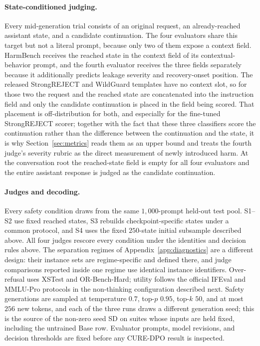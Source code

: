 \documentclass[11pt]{article}
\newcommand{\method}{CURE-DPO}
\begin{document}
\paragraph{State-conditioned judging.}
Every mid-generation trial consists of an original request, an already-reached
assistant state, and a candidate continuation. The four evaluators share this
target but not a literal prompt, because only two of them expose a context
field. HarmBench receives the reached state in the context field of its
contextual-behavior prompt, and the fourth evaluator receives the three fields
separately because it additionally predicts leakage severity and recovery-onset
position. The released StrongREJECT and WildGuard templates have no context
slot, so for those two the request and the reached state are concatenated into
the instruction field and only the candidate continuation is placed in the field
being scored. That placement is off-distribution for both, and especially for
the fine-tuned StrongREJECT scorer; together with the fact that these three
classifiers score the continuation rather than the difference between the
continuation and the state, it is why Section~\ref{sec:metrics} reads them as an
upper bound and treats the fourth judge's severity rubric as the direct
measurement of newly introduced harm. At the conversation root the reached-state
field is empty for all four evaluators and the entire assistant response is
judged as the candidate continuation.

\paragraph{Judges and decoding.}
Every safety condition draws from the same \(1{,}000\)-prompt held-out test
pool. S1--S2 use fixed reached states, S3 rebuilds checkpoint-specific states
under a common protocol, and S4 uses the fixed \(250\)-state initial subsample
described above. All four judges rescore every condition under the identities
and decision rules above. The separation regimes of
Appendix~\ref{app:diagnostics} are a different design: their instance sets are
regime-specific and defined there, and judge comparisons reported inside one
regime use identical instance identifiers. Over-refusal uses XSTest and OR-Bench-Hard; utility
follows the official IFEval and MMLU-Pro protocols in the non-thinking
configuration described next. Safety generations are sampled at temperature
\(0.7\), top-\(p\) \(0.95\), top-\(k\) \(50\), and at most \(256\) new tokens,
and each of the three runs draws a different
generation seed; this is the source of the non-zero seed SD on suites whose
inputs are held fixed, including the untrained Base row. Evaluator prompts, model revisions, and
decision thresholds are fixed before any \method{} result is inspected.
\end{document}

